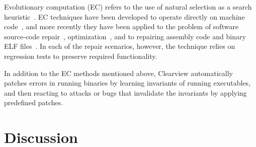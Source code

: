 \documentclass{sigcomm-alternate}
\begin{document}
Evolutionary computation (EC) refers to the use of natural selection
as a search heuristic~\cite{holland1992adaptation,koza1992genetic}.
EC techniques have been developed to operate 
directly on machine code~\cite{kuhling2002brute}, and more recently
they have been applied to the problem of software source-code
repair~\cite{genprog-tse-journal},
optimization~\cite{sitthi2011genetic,schulte2013optimization}, and to
repairing assembly code and binary ELF
files~\cite{schulte2013embedded}.  In each of the repair scenarios,
however, the technique relies on regression tests to
preserve required functionality.


In addition to the EC methods mentioned above, Clearview \cite{clearview}
automatically patches errors in running binaries by learning
invariants of running executables, and then reacting to attacks or
bugs that invalidate the invariants by applying predefined patches.

\section{Discussion}
\label{sec:discussion}

\end{document}
